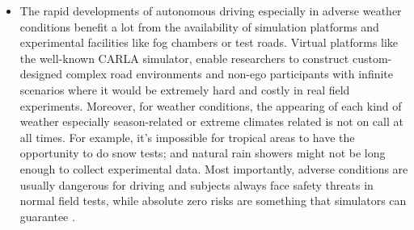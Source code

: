 \documentclass[rnd]{mas_proposal}
\begin{document}
\begin{itemize}
      \item The rapid developments of autonomous driving especially in adverse weather conditions benefit a lot from the availability of simulation platforms and experimental facilities like fog chambers or test roads. Virtual platforms like the well-known CARLA \cite{dosovitskiy2017carla} simulator, enable researchers to construct custom-designed complex road environments and non-ego participants with infinite scenarios where it would be extremely hard and costly in real field experiments. Moreover, for weather conditions, the appearing of each kind of weather especially season-related or extreme climates related is not on call at all times. For example, it’s impossible for tropical areas to have the opportunity to do snow tests; and natural rain showers might not be long enough to collect experimental data. Most importantly, adverse conditions are usually dangerous for driving and subjects always face safety threats in normal field tests, while absolute zero risks are something that simulators can guarantee \cite{Zhang2021Dec}.


\end{itemize}
\end{document}
